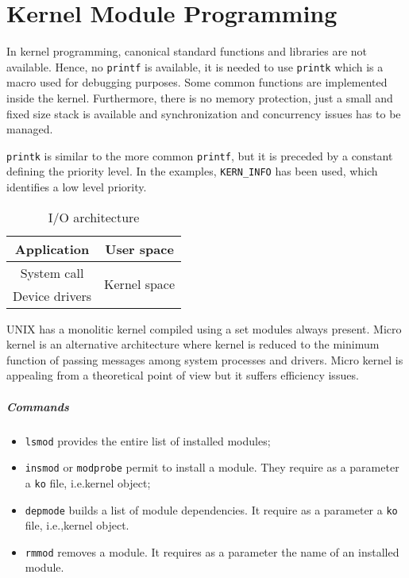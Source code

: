 \chapter{Kernel Module Programming}
In kernel programming, canonical standard functions and libraries are not available. Hence, no \texttt{printf} is available, it is needed to use \texttt{printk} which is a macro used for debugging purposes. Some common functions are implemented inside the kernel. Furthermore, there is no memory protection, just a small and fixed size stack is available and synchronization and concurrency issues has to be managed.

\texttt{printk} is similar to the more common \texttt{printf}, but it is preceded by a constant defining the priority level. In the examples, \texttt{KERN\_INFO} has been used, which identifies a low level priority.

\begin{table}
\centering
\begin{tabular}{|c|c|}
\hline 
Application & User space \\
\hline 
System call & \multirow{2}{*}{Kernel space} \\
Device drivers & \\
\hline 
\end{tabular}
\caption{I/O architecture}
\label{tab:io_architecture}
\end{table} 

UNIX has a monolitic kernel compiled using a set modules always present. Micro kernel is an alternative architecture where kernel is reduced to the minimum function of passing messages among system processes and drivers. Micro kernel is appealing from a theoretical point of view but it suffers efficiency issues.

\paragraph{Commands}
\begin{itemize}
\item \texttt{lsmod} provides the entire list of installed modules;
\item \texttt{insmod} or \texttt{modprobe} permit to install a module. They require as a parameter a \texttt{ko} file, i.e.\@ kernel object;
\item \texttt{depmode} builds a list of module dependencies. It require as a parameter a \texttt{ko} file, i.e.,\@ kernel object.
\item \texttt{rmmod} removes a module.  It requires as a parameter the name of an installed module.
\end{itemize}

